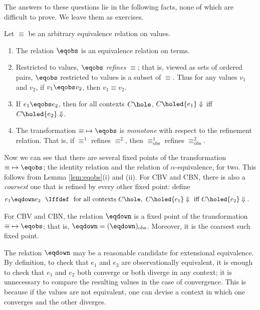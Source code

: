 The answers to these questions lie in the following facts, none of
which are difficult to prove.  We leave them as exercises.
\begin{lemma}
\label{lem:eqobs}
Let $\equiv$ be an arbitrary equivalence relation on values.
\begin{enumerate}
\renewcommand\labelenumi{\upshape(\roman{enumi})}
\item
The relation $\eqobs$ is an equivalence relation on terms.
\item
Restricted to values, $\eqobs$ \emph{refines} $\equiv$; that is,
viewed as sets of ordered pairs, $\eqobs$ restricted to values is a
subset of $\equiv$. Thus for any values $v_1$ and $v_2$, if $v_1\eqobs
v_2$, then $v_1\equiv v_2$.
\item
If $e_1\eqobs e_2$, then for all contexts $C\hole$,
$C\holed{e_1}\Downarrow$ iff $C\holed{e_2}\Downarrow$.
\item
The transformation ${\equiv}\mapsto{\eqobs}$ is \emph{monotone} with
respect to the refinement relation. That is, if $\equiv^1$ refines
$\equiv^2$, then $\equiv^1_{\mathrm{obs}}$ refines
$\equiv^2_{\mathrm{obs}}$.
\end{enumerate}
\end{lemma}
Now we can see that there are several fixed points of the transformation
${\equiv}\mapsto{\eqobs}$; the identity relation and the relation of
$\alpha$-equivalence, for two. This follows from
Lemma \ref{lem:eqobs}(i) and (ii). For CBV and CBN, there is also
a \emph{coarsest} one that is refined by every other fixed point: define
\begin{align*}
e_1\eqdown e_2\ \ &\Iffdef\ \ \text{for all contexts } C\hole,\ C\holed{e_1}\Downarrow \text{ iff } C\holed{e_2}\Downarrow.
\end{align*}
\begin{theorem}
\label{thm:obs}
For CBV and CBN, the relation $\eqdown$ is a fixed point of the transformation ${\equiv}\mapsto{\eqobs}$;
that is, ${\eqdown}=({\eqdown)_{\mathrm{obs}}}$. Moreover, it is the coarsest such fixed point.
\end{theorem}
The relation $\eqdown$ may be a reasonable candidate for extensional
equivalence.  By definition, to check that $e_1$ and $e_2$ are
observationally equivalent, it is enough to check that $e_1$ and $e_2$
both converge or both diverge in any context; it is unnecessary to
compare the resulting values in the case of convergence. This is
because if the values are not equivalent, one can devise a context in
which one converges and the other diverges.

